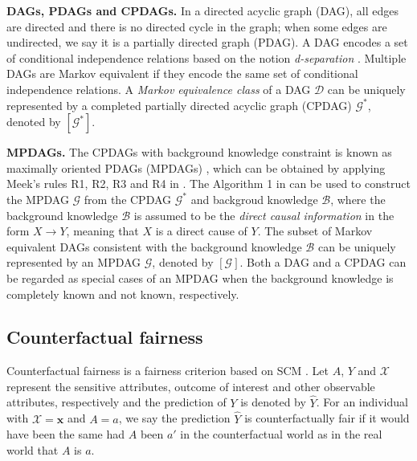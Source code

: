 \documentclass{article}
\begin{document}
\textbf{DAGs, PDAGs and CPDAGs.} In a directed acyclic graph (DAG), all edges are directed and there is no directed cycle in the graph; when some edges are undirected, we say it is a partially directed graph (PDAG). A DAG encodes a set of conditional independence relations based on the notion \textit{d-separation} \citep{pearl1988probabilistic}. Multiple DAGs are Markov equivalent if they encode the same set of conditional independence relations. A \textit{Markov equivalence class} of a DAG $\mathcal{D}$ can be uniquely represented by a completed partially directed acyclic graph (CPDAG) $\mathcal{G^*}$, denoted by $[\mathcal{G^*}]$.

\textbf{MPDAGs.} The CPDAGs with background knowledge constraint is known as maximally oriented PDAGs (MPDAGs) \citep{meek1995causal}, which can be obtained by applying Meek's rules R1, R2, R3 and R4 in \citep{meek1995causal}. The Algorithm 1 in \citep{perkovic2017interpreting} can be used to construct the MPDAG $\mathcal{G}$ from the CPDAG $\mathcal{G^*}$ and backgroud knowledge $\mathcal{B}$, where the background knowledge $\mathcal{B}$ is assumed to be the \textit{direct causal information} in the form $X \rightarrow Y$, meaning that $X$ is a direct cause of $Y$. The subset of Markov equivalent DAGs consistent with the background knowledge $\mathcal{B}$ can be uniquely represented by an MPDAG $\mathcal{G}$, denoted by $[\mathcal{G}]$. Both a DAG and a CPDAG can be regarded as special cases of an MPDAG when the background knowledge is completely known and not known, respectively.







\subsection{Counterfactual fairness} \label{sec: Counterfactual fairness}
Counterfactual fairness \citep{kusner2017counterfactual} is a fairness criterion based on SCM \citep{pearl2000models}. 
Let $A$, $Y$ and $\mathcal{X}$ represent the sensitive attributes, outcome of interest and other observable attributes, respectively and the prediction of $Y$ is denoted by $\hat{Y}$. For an individual with $\mathcal{X}=\mathbf{x}$ and $A=a$, we say the prediction $\hat{Y}$ is counterfactually fair if it would have been the same had $A$ been $a'$ in the counterfactual world as in the real world that $A$ is $a$.
\end{document}
